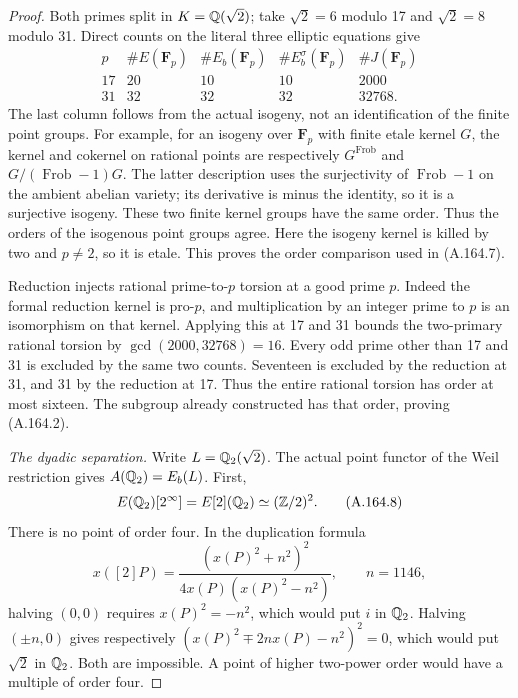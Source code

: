 \begin{proof}
Both primes split in \(K=\mathbb Q(\sqrt2)\); take
\(\sqrt2=6\) modulo 17 and \(\sqrt2=8\)
modulo 31.  Direct counts on the literal three
elliptic equations give
\[
 \begin{array}{c|ccc|c}
 p&\#E(\mathbf F_p)&\#E_b(\mathbf F_p)
                 &\#E_b^\sigma(\mathbf F_p)&\#J(\mathbf F_p)\\ \hline
 17&20&10&10&2000\\
 31&32&32&32&32768.
 \end{array}
\tag{A.164.7}
\]
The last column follows from the actual isogeny,
not an identification of the finite point groups.
For example, for an isogeny over \(\mathbf F_p\)
with finite etale kernel \(G\), the kernel and
cokernel on rational points are respectively
\(G^{\operatorname{Frob}}\) and
\(G/(\operatorname{Frob}-1)G\).  The latter
description uses the surjectivity of
\(\operatorname{Frob}-1\) on the ambient abelian
variety; its derivative is minus the identity,
so it is a surjective isogeny.  These two finite
kernel groups have the same order.  Thus the
orders of the isogenous point groups agree.
Here the isogeny kernel is killed by two and
\(p\ne2\), so it is etale.  This proves the
order comparison used in (A.164.7).

Reduction injects rational prime-to-\(p\) torsion
at a good prime \(p\).  Indeed the formal
reduction kernel is pro-\(p\), and multiplication
by an integer prime to \(p\) is an isomorphism
on that kernel.  Applying this at 17 and 31
bounds the two-primary rational torsion by
\(\gcd(2000,32768)=16\).  Every odd prime
other than 17 and 31 is excluded by the same
two counts.  Seventeen is excluded by the
reduction at 31, and 31 by the reduction at
17.  Thus the entire rational torsion has order
at most sixteen.  The subgroup already
constructed has that order, proving (A.164.2).

\emph{The dyadic separation.}
Write \(L=\mathbb Q_2(\sqrt2)\).  The actual point
functor of the Weil restriction gives
\(A(\mathbb Q_2)=E_b(L)\).  First,
\[
              E(\mathbb Q_2)[2^\infty]=E[2](\mathbb Q_2)
                                   \simeq(\mathbb Z/2)^2.
\tag{A.164.8}
\]
There is no point of order four.  In the
duplication formula
\[
                  x([2]P)=
                  \frac{(x(P)^2+n^2)^2}
                       {4x(P)(x(P)^2-n^2)},\qquad n=1146,
\tag{A.164.9}
\]
halving \((0,0)\) requires \(x(P)^2=-n^2\),
which would put \(i\) in \(\mathbb Q_2\).  Halving
\((\pm n,0)\) gives respectively
\((x(P)^2\mp2nx(P)-n^2)^2=0\), which would
put \(\sqrt2\) in \(\mathbb Q_2\).  Both are
impossible.  A point of higher two-power order
would have a multiple of order four.


\end{proof}
